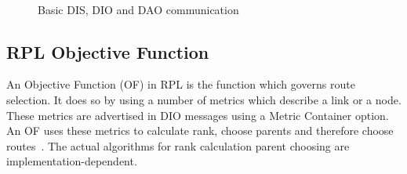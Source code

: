 \begin{figure}[htbp]
  \begin{center}
    \leavevmode
    \\
    \caption{Basic DIS, DIO and DAO communication}
    \label{fig:DIS/DIO/DAO}
  \end{center}
\end{figure}

\subsection{RPL Objective Function}
\label{RPL:OF}
An Objective Function (OF) in RPL is the function which governs route selection. It does so by using a number of metrics which describe a link or a node. These metrics are advertised in DIO messages using a Metric Container option. An OF uses these metrics to calculate rank, choose parents and therefore choose routes~\cite{MRHOF}. The actual algorithms for rank calculation parent choosing are implementation-dependent.

